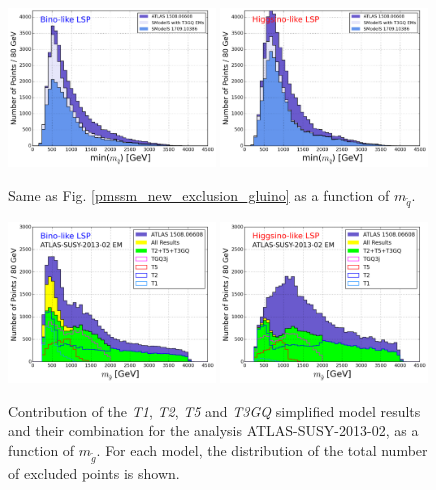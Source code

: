 \documentclass[a4paper,11pt]{article}
\newcommand{\MSQ}{$ m _{ \tilde q } $\xspace}
\newcommand{\MGLU}{$ m _{ \tilde g } $\xspace}
\begin{document}
\begin{figure}[!]
\begin{center}
\includegraphics[width=0.49\textwidth]{PLOTS/BINO_Comparison_Sq.png}
{\includegraphics[width=0.49\textwidth]{PLOTS/HIGGSINO_Comparison_Sq.png}}
\end{center}
\caption{Same as Fig. \ref{pmssm_new_exclusion_gluino} as a function of \MSQ.} 
\label{pmssm_new_exclusion_squark}
\end{figure}
%
%
\begin{figure}[!b]
\begin{center}
\subfigure
\includegraphics[width=0.49\textwidth]{PLOTS/BINO_Txnames_Contribution_ATLAS02_Gluino.png}
\subfigure
\includegraphics[width=0.49\textwidth]{PLOTS/HIGGSINO_Txnames_Contribution_ATLAS02_Gluino.png}
\end{center}
\caption{Contribution of the \textit{T1}, \textit{T2}, \textit{T5} and \textit{T3GQ} simplified model results and their combination for the analysis ATLAS-SUSY-2013-02, as a function of \MGLU. For each model, the distribution of the total number of excluded points is shown.} 
\label{combination_gluino}
%
\end{figure}
\end{document}
